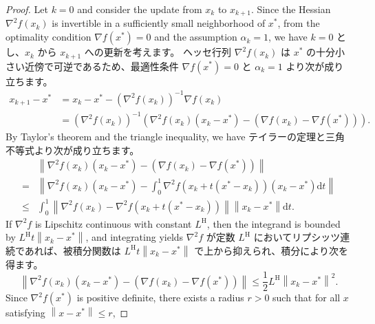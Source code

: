 \documentclass[0_main]{subfiles}
\begin{document}
\begin{proof}
    \ifEn
        Let $k=0$ and consider the update from $x_k$ to $x_{k+1}$.
        Since the Hessian $\nabla^2 f(x_k)$ is invertible in a sufficiently small neighborhood of $x^*$, from the optimality condition $\nabla f(x^*)=0$ and the assumption $\alpha_k=1$, we have
    \else
        $k=0$ とし、$x_k$ から $x_{k+1}$ への更新を考えます。
        ヘッセ行列 $\nabla^2 f(x_k)$ は $x^*$ の十分小さい近傍で可逆であるため、最適性条件 $\nabla f(x^*)=0$ と $\alpha_k=1$ より次が成り立ちます。
    \fi
    \begin{align*}
        x_{k+1} - x^*
         & = x_k - x^* - \left(\nabla^2 f(x_k)\right)^{-1}\nabla f(x_k)                                                        \\
         & = \left(\nabla^2 f(x_k)\right)^{-1} \left(\nabla^2 f(x_k)(x_k-x^*)-\left(\nabla f(x_k)-\nabla f(x^*)\right)\right).
    \end{align*}
    \ifEn
        By Taylor's theorem and the triangle inequality, we have
    \else
        テイラーの定理と三角不等式より次が成り立ちます。
    \fi
    \begin{align*}
                & \left\lVert \nabla^2 f(x_k)(x_k-x^*)-\left(\nabla f(x_k)-\nabla f(x^*)\right) \right\rVert                               \\
        =   {}  & \left\lVert \nabla^2 f(x_k)(x_k-x^*)-\int_0^1 \nabla^2 f(x_k+t(x^*-x_k)) (x_k - x^*)\mathrm{d}t \right\rVert             \\
        \leq {} & \int_0^1 \left\lVert \nabla^2 f(x_k)-\nabla^2 f(x_k+t(x^*-x_k)) \right\rVert\left\lVert x_k-x^* \right\rVert\mathrm{d}t.
    \end{align*}
    \ifEn
        If $\nabla^2 f$ is Lipschitz continuous with constant $L^{\mathrm{H}}$, then the integrand is bounded by $L^{\mathrm{H}}t\left\lVert x_k-x^* \right\rVert$, and integrating yields
    \else
        $\nabla^2 f$ が定数 $L^{\mathrm{H}}$ においてリプシッツ連続であれば、被積分関数は $L^{\mathrm{H}}t\left\lVert x_k-x^* \right\rVert$ で上から抑えられ、積分により次を得ます。
    \fi
    \begin{equation*}
        \left\lVert \nabla^2 f(x_k)(x_k-x^*)-\left(\nabla f(x_k)-\nabla f(x^*)\right) \right\rVert
        \le \frac{1}{2}L^{\mathrm{H}}\left\lVert x_k-x^* \right\rVert^2.
    \end{equation*}
    \ifEn
        Since $\nabla^2 f(x^*)$ is positive definite, there exists a radius $r>0$ such that for all $x$ satisfying $\left\lVert x-x^* \right\rVert\le r$,

\end{proof}
\end{document}
